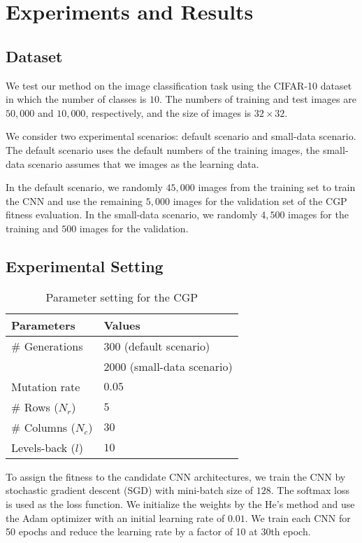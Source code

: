 \section{Experiments and Results}
\subsection{Dataset}
We test our method on the image classification task using the CIFAR-10 dataset in which the number of classes is $10$. The numbers of training and test images are $50,000$ and $10,000$, respectively, and the size of images is $32 \times 32$.

We consider two experimental scenarios:  default scenario and  small-data scenario.
The default scenario uses the default numbers of the training images,  the small-data scenario assumes that we  images as the learning data. 

In the default scenario, we randomly  $45,000$ images from the training set to train the CNN\new{,} and  use the remaining $5,000$ images for the validation set of the CGP fitness evaluation.
In the small-data scenario, we randomly  $4,500$ images for the training and $500$ images for the validation.

\subsection{Experimental Setting}

\begin{table}[t]
  \caption{Parameter setting for the CGP}
  \label{cgp_param}
  \begin{tabular}{l|l} \hline
    Parameters & Values \\ \hline
   \# Generations & $300$ (default scenario) \\ 
                          & $2000$ (small-data scenario) \\ 
   Mutation rate & $0.05$ \\
   \#  Rows ($N_r$) & $5$ \\
   \#  Columns ($N_c$) & $30$ \\
   Levels-back ($l$) & $10$ \\ \hline
  \end{tabular}
\end{table}


To assign the fitness to the candidate CNN architectures, we train the CNN by stochastic gradient descent (SGD) with  mini-batch size of $128$. The softmax  loss is used as the loss function.
We initialize the weights by the He's method \cite{he_delving_2015} and use the Adam optimizer \cite{kingma_adam:_2015} with an initial learning rate of $0.01$. 
We train each CNN for 50 epochs and reduce the learning rate by a factor of 10 at 30th epoch.


